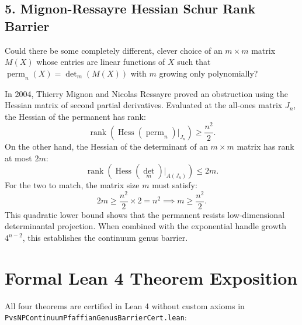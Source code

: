 \documentclass[11pt,a4paper]{article}
\theoremstyle{definition}
\begin{document}
\subsection{5. Mignon-Ressayre Hessian Schur Rank Barrier}
Could there be some completely different, clever choice of an $m \times m$ matrix $M(X)$ whose entries are linear functions of $X$ such that $\operatorname{perm}_n(X) = \det_m(M(X))$ with $m$ growing only polynomially?

In 2004, Thierry Mignon and Nicolas Ressayre proved an obstruction using the Hessian matrix of second partial derivatives. Evaluated at the all-ones matrix $J_n$, the Hessian of the permanent has rank:
\begin{equation}
\operatorname{rank}(\operatorname{Hess}(\operatorname{perm}_n)|_{J_n}) \ge \frac{n^2}{2}.
\end{equation}
On the other hand, the Hessian of the determinant of an $m \times m$ matrix has rank at most $2m$:
\begin{equation}
\operatorname{rank}(\operatorname{Hess}(\det_m)|_{A(J_n)}) \le 2m.
\end{equation}
For the two to match, the matrix size $m$ must satisfy:
\begin{equation}
2m \ge \frac{n^2}{2} \times 2 = n^2 \implies m \ge \frac{n^2}{2}.
\end{equation}
This quadratic lower bound shows that the permanent resists low-dimensional determinantal projection. When combined with the exponential handle growth $4^{n-2}$, this establishes the continuum genus barrier.


\section{Formal Lean 4 Theorem Exposition}

All four theorems are certified in Lean 4 without custom axioms in \texttt{PvsNPContinuumPfaffianGenusBarrierCert.lean}:
\end{document}
